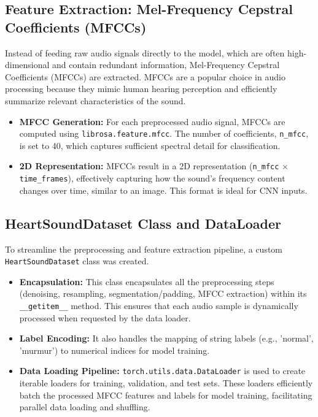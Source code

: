 \documentclass[a4paper]{article}
\begin{document}
\begin{multicols}{2}
\subsection{Feature Extraction: Mel-Frequency Cepstral Coefficients (MFCCs)}
Instead of feeding raw audio signals directly to the model, which are often high-dimensional and contain redundant information, Mel-Frequency Cepstral Coefficients (MFCCs) are extracted. MFCCs are a popular choice in audio processing because they mimic human hearing perception and efficiently summarize relevant characteristics of the sound.
\begin{itemize}
    \item \textbf{MFCC Generation:} For each preprocessed audio signal, MFCCs are computed using \texttt{librosa.feature.mfcc}. The number of coefficients, \texttt{n\_mfcc}, is set to 40, which captures sufficient spectral detail for classification.
    \item \textbf{2D Representation:} MFCCs result in a 2D representation (\texttt{n\_mfcc} $\times$ \texttt{time\_frames}), effectively capturing how the sound's frequency content changes over time, similar to an image. This format is ideal for CNN inputs.
\end{itemize}

\subsection{HeartSoundDataset Class and DataLoader}
To streamline the preprocessing and feature extraction pipeline, a custom \texttt{HeartSoundDataset} class was created.
\begin{itemize}
    \item \textbf{Encapsulation:} This class encapsulates all the preprocessing steps (denoising, resampling, segmentation/padding, MFCC extraction) within its \texttt{\_\_getitem\_\_} method. This ensures that each audio sample is dynamically processed when requested by the data loader.
    \item \textbf{Label Encoding:} It also handles the mapping of string labels (e.g., 'normal', 'murmur') to numerical indices for model training.
    \item \textbf{Data Loading Pipeline:} \texttt{torch.utils.data.DataLoader} is used to create iterable loaders for training, validation, and test sets. These loaders efficiently batch the processed MFCC features and labels for model training, facilitating parallel data loading and shuffling.
\end{itemize}


\end{multicols}
\end{document}

